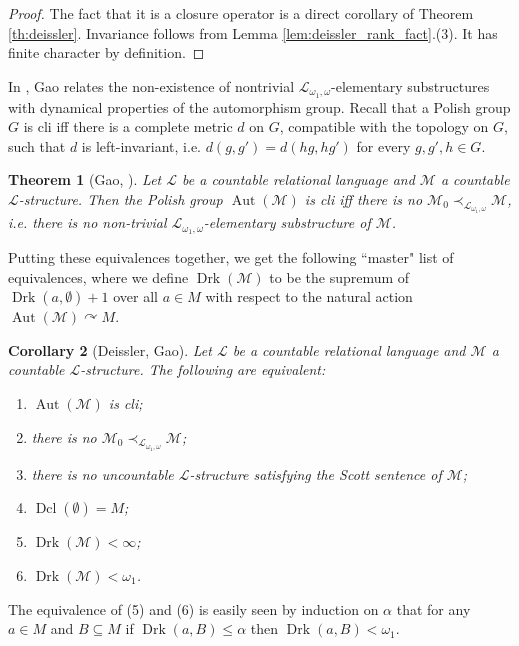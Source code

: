 \documentclass[12pt]{amsart}
\theoremstyle{plain}
\newtheorem{theorem}{Theorem}[section]
\newtheorem{corollary}[theorem]{Corollary}
\theoremstyle{definition}
\newcommand{\countlogic}{\mathcal{L}_{\omega_1, \omega}}
\newcommand{\mcL}{\mathcal{L}}
\newcommand{\mcM}{\mathcal{M}}
\DeclareMathOperator{\Aut}{Aut}
\DeclareMathOperator{\Drk}{Drk}
\DeclareMathOperator{\Dcl}{Dcl}
\begin{document}
\begin{proof}
The fact that it is a closure operator is a direct corollary of Theorem \ref{th:deissler}.
Invariance follows from Lemma \ref{lem:deissler_rank_fact}.(3).
It has finite character by definition.
\end{proof}

In \cite{Gao1998}, Gao relates the non-existence of nontrivial $\mcL_{\omega_1, \omega}$-elementary substructures with dynamical properties of the automorphism group.
Recall that a Polish group $G$ is cli iff there is a complete metric $d$ on $G$, compatible with the topology on $G$, such that $d$ is left-invariant, i.e. $d(g, g') = d(hg, hg')$ for every $g, g', h \in G$.

\begin{theorem}[Gao, \cite{Gao1998}]
Let $\mcL$ be a countable relational language and $\mcM$ a countable $\mcL$-structure. 
Then the Polish group $\Aut(\mcM)$ is cli iff there is no $\mcM_0 \prec_{\countlogic} \mcM$, i.e. there is no non-trivial $\countlogic$-elementary substructure of $\mcM$.
\end{theorem}

Putting these equivalences together, we get the following ``master" list of equivalences, where we define $\Drk(\mcM)$ to be the supremum of $\Drk(a, \emptyset) + 1$ over all $a \in M$ with respect to the natural action $\Aut(\mcM) \curvearrowright M$.

\begin{corollary}[Deissler, Gao]\label{cor:deissler}
Let $\mcL$ be a countable relational language and $\mcM$ a countable $\mcL$-structure.
The following are equivalent:
\begin{enumerate}
    \item $\Aut(\mcM)$ is cli;
    \item there is no $\mcM_0 \prec_{\countlogic} \mcM$;
    \item there is no uncountable $\mcL$-structure satisfying the Scott sentence of $\mcM$;
    \item $\Dcl(\emptyset) = M$;
    \item $\Drk(\mcM) < \infty$;
    \item $\Drk(\mcM) < \omega_1$.
\end{enumerate}
\end{corollary}
The equivalence of (5) and (6) is easily seen by induction on $\alpha$ that for any $a \in M$ and $B \subseteq M$ if $\Drk(a, B) \le \alpha$ then $\Drk(a, B) < \omega_1$.
\end{document}

